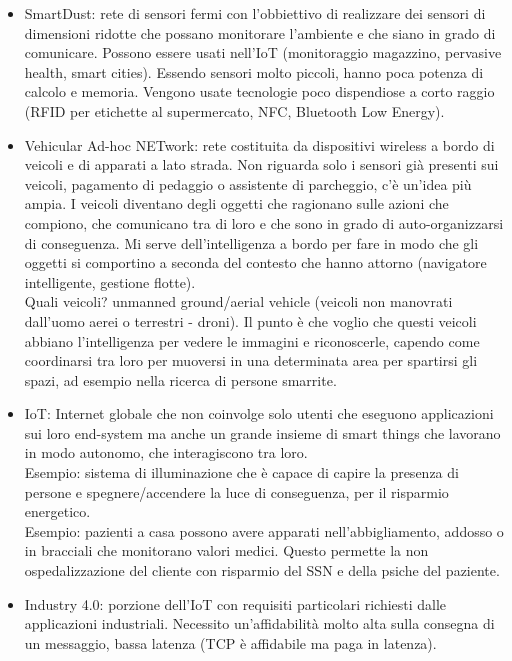 \documentclass[12pt,italian]{report}
\begin{document}
\begin{itemize}
    \item SmartDust: rete di sensori fermi con l'obbiettivo di realizzare dei sensori di dimensioni ridotte che possano monitorare l'ambiente e che siano in grado di comunicare. Possono essere usati nell'IoT (monitoraggio magazzino, pervasive health, smart cities). Essendo sensori molto piccoli, hanno poca potenza di calcolo e memoria. Vengono usate tecnologie poco dispendiose a corto raggio (RFID per etichette al supermercato, NFC, Bluetooth Low Energy).  
    \item Vehicular Ad-hoc NETwork: rete costituita da dispositivi wireless a bordo di veicoli e di apparati a lato strada. Non riguarda solo i sensori già presenti sui veicoli, pagamento di pedaggio o assistente di parcheggio, c'è un'idea più ampia. I veicoli diventano degli oggetti che ragionano sulle azioni che compiono, che comunicano tra di loro e che sono in grado di auto-organizzarsi di conseguenza. Mi serve dell'intelligenza a bordo per fare in modo che gli oggetti si comportino a seconda del contesto che hanno attorno (navigatore intelligente, gestione flotte). 
    \\Quali veicoli? unmanned ground/aerial vehicle (veicoli non manovrati dall'uomo aerei o terrestri - droni). Il punto è che voglio che questi veicoli abbiano l'intelligenza per vedere le immagini e riconoscerle, capendo come coordinarsi tra loro per muoversi in una determinata area per spartirsi gli spazi, ad esempio nella ricerca di persone smarrite. 
    \item IoT: Internet globale che non coinvolge solo utenti che eseguono applicazioni sui loro end-system ma anche un grande insieme di smart things che lavorano in modo autonomo, che interagiscono tra loro. 
    \\Esempio: sistema di illuminazione che è capace di capire la presenza di persone e spegnere/accendere la luce di conseguenza, per il risparmio energetico. 
    \\Esempio: pazienti a casa possono avere apparati nell'abbigliamento, addosso o in bracciali che monitorano valori medici. Questo permette la non ospedalizzazione del cliente con risparmio del SSN e della psiche del paziente. 
    \item Industry 4.0: porzione dell'IoT con requisiti particolari richiesti dalle applicazioni industriali. Necessito un'affidabilità molto alta sulla consegna di un messaggio, bassa latenza (TCP è affidabile ma paga in latenza). 
\end{itemize}
\end{document}
